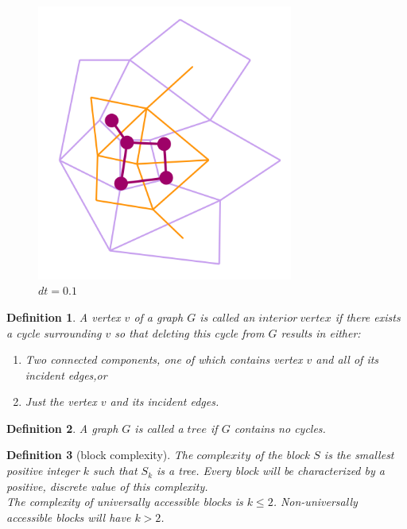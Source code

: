 \documentclass[10pt]{article}
\newtheorem{definition}{Definition}
\begin{document}
\begin{figure}[H]
\begin{minipage}{.33\textwidth}
    \end{minipage}%
    \begin{minipage}{.33\textwidth}
        \centering
        \includegraphics[width=0.75\textwidth]{images/dual3}
        \caption{$dt=0.1$}
        \label{fig:prob1_6_2}
    \end{minipage}
\end{figure}


\begin{definition}
A vertex $v$ of a graph $G$ is called an $interior\ vertex$ if there exists a cycle surrounding $v$ so that deleting this cycle from $G$ results in either:
    \begin{enumerate}
        \item Two connected components, one of which contains vertex $v$ and all of its incident edges,or
        \item Just the vertex $v$ and its incident edges.
    \end{enumerate}
\end{definition}

\begin{definition}
A graph $G$ is called a $tree$ if $G$ contains no cycles. 
\end{definition}

\begin{definition}[block complexity]
The $complexity$ of the block $S$ is the smallest positive integer $k$ such that $S_k$ is a tree. Every block will be characterized by a positive, discrete value of this complexity. \\
The complexity of universally accessible blocks is $k \leq 2$. Non-universally accessible blocks will have $k>2$.
\end{definition}
\end{document}
